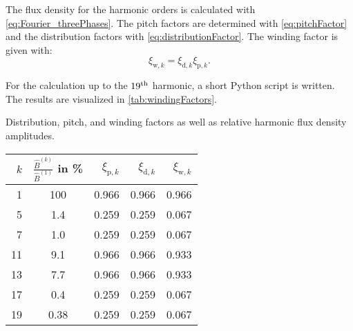 \begin{solutionblock}
    The flux density for the harmonic orders is calculated with \eqref{eq:Fourier_threePhases}. The pitch factors are determined with \eqref{eq:pitchFactor} and the distribution factors with \eqref{eq:distributionFactor}. The winding factor is given with:
    \begin{equation}
        \xi_{\mathrm{w,}k} = \xi_{\mathrm{d,}k} \xi_{\mathrm{p,}k}.
    \end{equation}

    For the calculation up to the $19\textsuperscript{th}$ harmonic, a short Python script is written.
    The results are visualized in \autoref{tab:windingFactors}.
    \begin{solutiontable}[ht]
        \caption{Distribution, pitch, and winding factors as well as relative harmonic flux density  amplitudes.}
        \centering
        \begin{tabular}{rcrrr}\toprule
            $k$ & $\frac{\hat{B}^{(k)}}{\hat{B}^{(1)}}$ in \% & $\xi_{\mathrm{p,}k}$ & $\xi_{\mathrm{d,}k}$ & $\xi_{\mathrm{w,}k}$ \\
            \midrule
            1   & 100                                         & 0.966                & 0.966                & 0.966                \\
            5   & 1.4                                         & 0.259                & 0.259                & 0.067                \\
            7   & 1.0                                         & 0.259                & 0.259                & 0.067                \\
            11  & 9.1                                         & 0.966                & 0.966                & 0.933                \\
            13  & 7.7                                         & 0.966                & 0.966                & 0.933                \\
            17  & 0.4                                         & 0.259                & 0.259                & 0.067                \\
            19  & 0.38                                        & 0.259                & 0.259                & 0.067                \\
            \bottomrule
        \end{tabular}
        \label{tab:windingFactors}
    \end{solutiontable}

\end{solutionblock}

